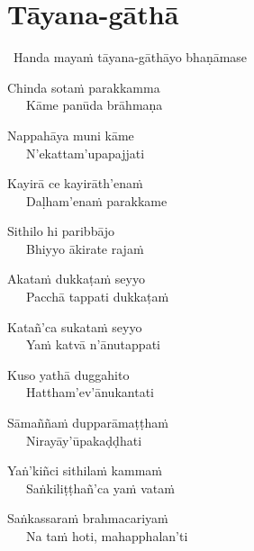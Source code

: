 
\section{Tāyana-gāthā}
\label{tayana-gatha}

\begin{intro}
	\anglebracketleft\ \hspace{-0.5mm}Handa mayaṁ tāyana-gāthāyo bhaṇāmase \hspace{-0.5mm}\anglebracketright\
\end{intro}


\begin{hanging-indent}
Chinda sotaṁ parakkamma\\
Kāme panūda brāhmaṇa
\end{hanging-indent}

\begin{hanging-indent}
Nappahāya muni kāme\\
N'ekattam'upapajjati
\end{hanging-indent}

\begin{hanging-indent}
Kayirā ce kayirāth'enaṁ\\
Daḷham'enaṁ parakkame
\end{hanging-indent}

\begin{hanging-indent}
Sithilo hi paribbājo\\
Bhiyyo ākirate rajaṁ
\end{hanging-indent}

\begin{hanging-indent}
Akataṁ dukkaṭaṁ seyyo\\
Pacchā tappati dukkaṭaṁ
\end{hanging-indent}

\begin{hanging-indent}
Katañ'ca sukataṁ seyyo\\
Yaṁ katvā n'ānutappati
\end{hanging-indent}

\begin{hanging-indent}
Kuso yathā duggahito\\
Hattham'ev'ānukantati
\end{hanging-indent}

\ifninebythirteenversion \clearpage \fi

\begin{hanging-indent}
Sāmaññaṁ dupparāmaṭṭhaṁ\\
Nirayāy'ūpakaḍḍhati
\end{hanging-indent}

\begin{hanging-indent}
Yaṅ'kiñci sithilaṁ kammaṁ\\
Saṅkiliṭṭhañ'ca yaṁ vataṁ
\end{hanging-indent}

\begin{hanging-indent}
Saṅkassaraṁ brahmacariyaṁ\\
Na taṁ hoti, mahapphalan'ti
\end{hanging-indent}

\suttaRef{[SN 2.8]}

\clearpage

